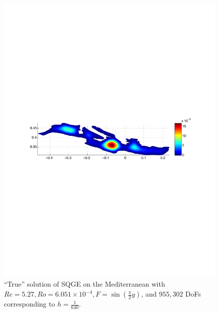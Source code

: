 \begin{figure}
  \begin{center}
    \includegraphics[scale=0.7]{Figures/SQGEMedRe5_27Ro6_051E-4h320sin0_25piy.pdf}
    \caption{``True'' solution of SQGE on the Mediterranean with $Re = 5.27, Ro
      = 6.051\times 10^{-4}, F = \sin( \frac{\pi}{2} y)$, and $955,302$ DoFs
      corresponding to $h = \frac{1}{640}$.}
    \label{fig:SQGEMed}
  \end{center}
\end{figure}
